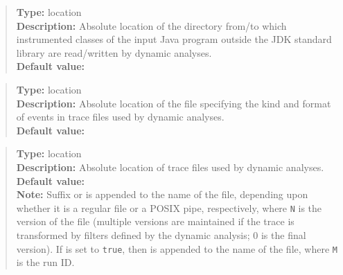 \begin{quote}
{\bf Type:} location  \\
{\bf Description:} Absolute location of the directory from/to which instrumented classes of the input Java program outside the JDK standard library are read/written by dynamic analyses. \\
{\bf Default value:} 
\end{quote}

\begin{quote}
{\bf Type:} location \\
{\bf Description:} Absolute location of the file specifying the kind and format of events in trace files used by dynamic analyses. \\
{\bf Default value:} 
\end{quote}

\begin{quote}
{\bf Type:} location  \\
{\bf Description:} Absolute location of trace files used by dynamic analyses. \\
{\bf Default value:}  \\
{\bf Note:} Suffix  or  is appended to the name of the file, depending upon whether it is a regular file or a POSIX pipe, respectively, where {\tt N} is the version of the file (multiple versions are maintained if the trace is transformed by filters defined by the dynamic analysis; 0 is the final version).  If  is set to {\tt true}, then  is appended to the name of the file, where {\tt M} is the run ID. 
\end{quote}



